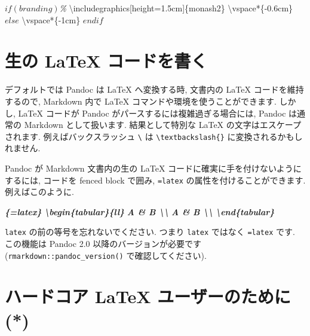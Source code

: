 \documentclass[
  11pt,
  lualatex,ja=standard,jafont=noto]{bxjsreport}
\newenvironment{Shaded}{\begin{snugshade}}{\end{snugshade}}
\newcommand{\BuiltInTok}[1]{#1}
\newcommand{\CommentTok}[1]{\textcolor[rgb]{0.56,0.35,0.01}{\textit{#1}}}
\newcommand{\ExtensionTok}[1]{#1}
\newcommand{\FunctionTok}[1]{\textcolor[rgb]{0.00,0.00,0.00}{#1}}
\newcommand{\InformationTok}[1]{\textcolor[rgb]{0.56,0.35,0.01}{\textbf{\textit{#1}}}}
\newcommand{\NormalTok}[1]{#1}
\newcommand{\SpecialStringTok}[1]{\textcolor[rgb]{0.31,0.60,0.02}{#1}}
\begin{document}
\begin{Shaded}
\begin{Highlighting}[]
\SpecialStringTok{$if(branding)$}\CommentTok{\%}
\BuiltInTok{\textbackslash{}includegraphics}\NormalTok{[height=1.5cm]\{}\ExtensionTok{monash2}\NormalTok{\}}
\FunctionTok{\textbackslash{}vspace*}\NormalTok{\{{-}0.6cm\}}
\SpecialStringTok{$else$}
\FunctionTok{\textbackslash{}vspace*}\NormalTok{\{{-}1cm\}}
\SpecialStringTok{$endif$}
\end{Highlighting}
\end{Shaded}

\hypertarget{raw-latex}{%
\section{生の LaTeX コードを書く}\label{raw-latex}}

デフォルトでは Pandoc は LaTeX へ変換する時, 文書内の LaTeX コードを維持するので, Markdown 内で LaTeX コマンドや環境を使うことができます. しかし, LaTeX コードが Pandoc がパースするには複雑過ぎる場合には, Pandoc は通常の Markdown として扱います. 結果として特別な LaTeX の文字はエスケープされます. 例えばバックスラッシュ \texttt{\textbackslash{}} は \texttt{\textbackslash{}textbackslash\{\}} に変換されるかもしれません.

Pandoc が Markdown 文書内の生の LaTeX コードに確実に手を付けないようにするには, コードを fenced block で囲み, \texttt{=latex} の属性を付けることができます. 例えばこのように.

\begin{Shaded}
\begin{Highlighting}[]
\InformationTok{\textasciigrave{}\textasciigrave{}\textasciigrave{}\{=latex\}}
\InformationTok{\textbackslash{}begin\{tabular\}\{ll\}}
\InformationTok{A \& B \textbackslash{}\textbackslash{}}
\InformationTok{A \& B \textbackslash{}\textbackslash{}}
\InformationTok{\textbackslash{}end\{tabular\}}
\InformationTok{\textasciigrave{}\textasciigrave{}\textasciigrave{}}
\end{Highlighting}
\end{Shaded}

\texttt{latex} の前の等号を忘れないでください. つまり \texttt{latex} ではなく \texttt{=latex} です. この機能は Pandoc 2.0 以降のバージョンが必要です (\texttt{rmarkdown::pandoc\_version()} で確認してください).

\hypertarget{latex-hardcore}{%
\section{ハードコア LaTeX ユーザーのために (*)}\label{latex-hardcore}}
\end{document}

